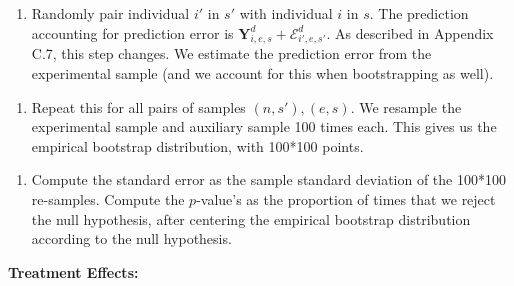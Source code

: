 \documentclass[static]{JJH-Beamer}
\begin{document}
\begin{frame}
 \addtocounter{framenumber}{-1}

\begin{enumerate}[7.]
\item Randomly pair individual $i'$ in $s'$ with individual $i$ in $s$. The prediction accounting for prediction error is $\bm{Y}_{i,e,s}^d + \bm{\mathcal{E}}_{i',e,s'}^d$. As described in Appendix C.7, this step changes. We estimate the prediction error from the experimental sample (and we account for this when bootstrapping as well).
\end{enumerate}

\end{frame}

\begin{frame}
 \addtocounter{framenumber}{-1}

\begin{enumerate}[8.]
\item Repeat this for all pairs of samples $(n,s'), (e,s)$. We resample the experimental sample and auxiliary sample 100 times each. This gives us the empirical bootstrap distribution, with 100*100 points.
\end{enumerate}

\end{frame}

\begin{frame}
 \addtocounter{framenumber}{-1}

\begin{enumerate}[9.]
\item Compute the standard error as the sample standard deviation of the 100*100 re-samples. Compute the $p$-value's as the proportion of times that we reject the null hypothesis, after centering the empirical bootstrap distribution according to the null hypothesis.
\end{enumerate}

\end{frame}

\begin{frame}
 \addtocounter{framenumber}{-1}

\begin{center}
\textbf{Treatment Effects:}\label{little-TE}
\end{center}

\end{frame}
\end{document}
